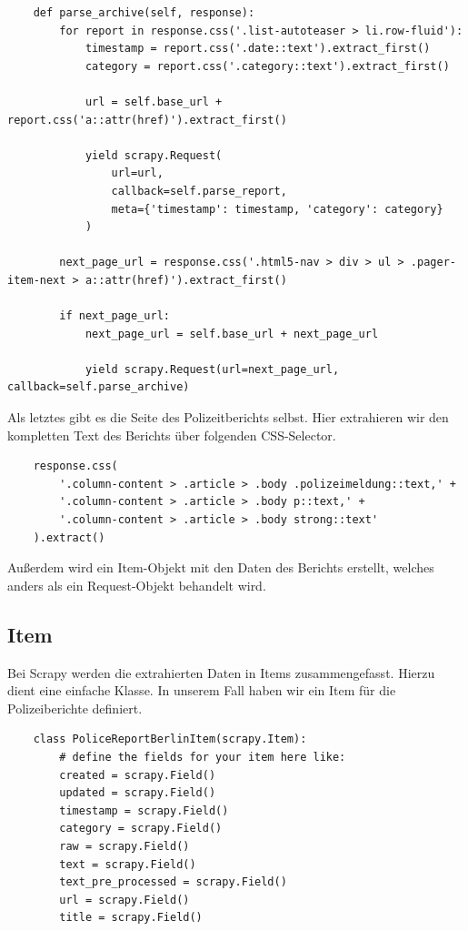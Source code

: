 \documentclass[chapterprefix=false, 12pt, a4paper, oneside, parskip=half, listof=totoc, bibliography=totoc, numbers=noendperiod]{scrbook}
\begin{document}
    \begin{verbatim}
    def parse_archive(self, response):
        for report in response.css('.list-autoteaser > li.row-fluid'):
            timestamp = report.css('.date::text').extract_first()
            category = report.css('.category::text').extract_first()

            url = self.base_url + report.css('a::attr(href)').extract_first()

            yield scrapy.Request(
                url=url,
                callback=self.parse_report,
                meta={'timestamp': timestamp, 'category': category}
            )

        next_page_url = response.css('.html5-nav > div > ul > .pager-item-next > a::attr(href)').extract_first()

        if next_page_url:
            next_page_url = self.base_url + next_page_url

            yield scrapy.Request(url=next_page_url, callback=self.parse_archive)
    \end{verbatim}

    \pagebreak

    Als letztes gibt es die Seite des Polizeitberichts selbst.
    Hier extrahieren wir den kompletten Text des Berichts über folgenden CSS-Selector.

    \begin{verbatim}
    response.css(
        '.column-content > .article > .body .polizeimeldung::text,' +
        '.column-content > .article > .body p::text,' +
        '.column-content > .article > .body strong::text'
    ).extract()
    \end{verbatim}

    Außerdem wird ein Item-Objekt mit den Daten des Berichts erstellt, welches anders als ein Request-Objekt behandelt wird.

    \subsection{Item}

    Bei Scrapy werden die extrahierten Daten in Items zusammengefasst. Hierzu dient eine einfache Klasse.
    In unserem Fall haben wir ein Item für die Polizeiberichte definiert.

    \begin{verbatim}
    class PoliceReportBerlinItem(scrapy.Item):
        # define the fields for your item here like:
        created = scrapy.Field()
        updated = scrapy.Field()
        timestamp = scrapy.Field()
        category = scrapy.Field()
        raw = scrapy.Field()
        text = scrapy.Field()
        text_pre_processed = scrapy.Field()
        url = scrapy.Field()
        title = scrapy.Field()
    \end{verbatim}
\end{document}
